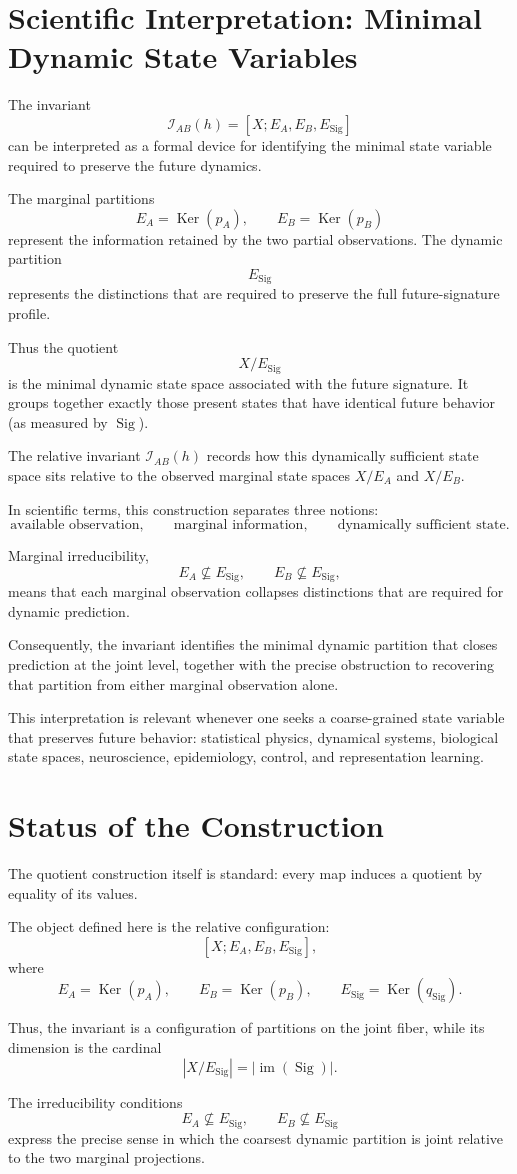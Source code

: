 \documentclass[11pt]{article}
\newcommand{\Sig}{\operatorname{Sig}}
\newcommand{\im}{\operatorname{im}}
\newcommand{\Ker}{\operatorname{Ker}}
\begin{document}
\section{Scientific Interpretation: Minimal Dynamic State Variables}

The invariant
\[
\mathcal I_{AB}(h)=[X;E_A,E_B,E_\Sig]
\]
can be interpreted as a formal device for identifying the minimal state variable required to preserve the future dynamics.

The marginal partitions
\[
E_A=\Ker(p_A),
\qquad
E_B=\Ker(p_B)
\]
represent the information retained by the two partial observations. The dynamic partition
\[
E_\Sig
\]
represents the distinctions that are required to preserve the full future-signature profile.

Thus the quotient
\[
X/E_\Sig
\]
is the minimal dynamic state space associated with the future signature. It groups together exactly those present states that have identical future behavior (as measured by \(\Sig\)).

The relative invariant \(\mathcal I_{AB}(h)\) records how this dynamically sufficient state space sits relative to the observed marginal state spaces \(X/E_A\) and \(X/E_B\).

In scientific terms, this construction separates three notions:
\[
\text{available observation},
\qquad
\text{marginal information},
\qquad
\text{dynamically sufficient state}.
\]

Marginal irreducibility,
\[
E_A\nsubseteq E_\Sig,
\qquad
E_B\nsubseteq E_\Sig,
\]
means that each marginal observation collapses distinctions that are required for dynamic prediction.

Consequently, the invariant identifies the minimal dynamic partition that closes prediction at the joint level, together with the precise obstruction to recovering that partition from either marginal observation alone.

This interpretation is relevant whenever one seeks a coarse-grained state variable that preserves future behavior: statistical physics, dynamical systems, biological state spaces, neuroscience, epidemiology, control, and representation learning.

\section{Status of the Construction}

The quotient construction itself is standard: every map induces a quotient by equality of its values.

The object defined here is the relative configuration:
\[
[X;E_A,E_B,E_\Sig],
\]
where
\[
E_A=\Ker(p_A),
\qquad
E_B=\Ker(p_B),
\qquad
E_\Sig=\Ker(q_\Sig).
\]

Thus, the invariant is a configuration of partitions on the joint fiber, while its dimension is the cardinal
\[
|X/E_\Sig|=|\im(\Sig)|.
\]

The irreducibility conditions
\[
E_A\nsubseteq E_\Sig,
\qquad
E_B\nsubseteq E_\Sig
\]
express the precise sense in which the coarsest dynamic partition is joint relative to the two marginal projections.
\end{document}

